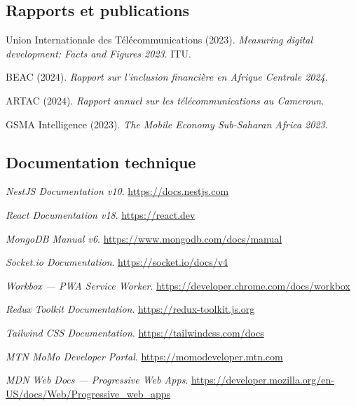 \documentclass[12pt,a4paper,oneside]{report}
\begin{document}
\subsection*{Rapports et publications}

\begin{enumerate}[label={[\arabic*]}, resume]
  \item Union Internationale des Télécommunications (2023). \textit{Measuring digital development: Facts and Figures 2023}. ITU.
  \item BEAC (2024). \textit{Rapport sur l'inclusion financière en Afrique Centrale 2024}.
  \item ARTAC (2024). \textit{Rapport annuel sur les télécommunications au Cameroun}.
  \item GSMA Intelligence (2023). \textit{The Mobile Economy Sub-Saharan Africa 2023}.
\end{enumerate}

\subsection*{Documentation technique}

\begin{enumerate}[label={[\arabic*]}, resume]
  \item \textit{NestJS Documentation v10}. \url{https://docs.nestjs.com}
  \item \textit{React Documentation v18}. \url{https://react.dev}
  \item \textit{MongoDB Manual v6}. \url{https://www.mongodb.com/docs/manual}
  \item \textit{Socket.io Documentation}. \url{https://socket.io/docs/v4}
  \item \textit{Workbox — PWA Service Worker}. \url{https://developer.chrome.com/docs/workbox}
  \item \textit{Redux Toolkit Documentation}. \url{https://redux-toolkit.js.org}
  \item \textit{Tailwind CSS Documentation}. \url{https://tailwindcss.com/docs}
  \item \textit{MTN MoMo Developer Portal}. \url{https://momodeveloper.mtn.com}
  \item \textit{MDN Web Docs — Progressive Web Apps}. \url{https://developer.mozilla.org/en-US/docs/Web/Progressive_web_apps}
\end{enumerate}
\end{document}
